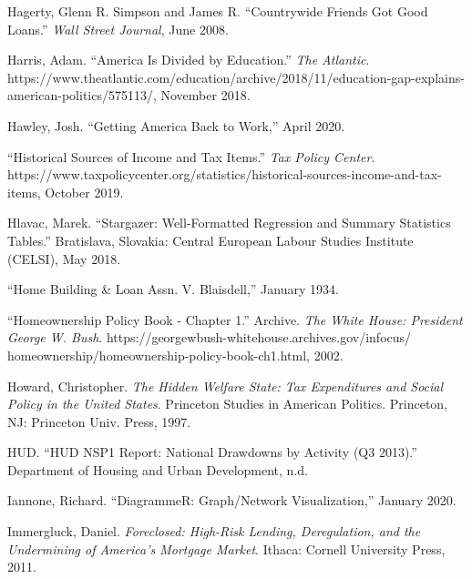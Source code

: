 \documentclass[12pt,oneside]{psthesis}
\begin{document}
\leavevmode\hypertarget{ref-hagerty2008countrywide}{}%
Hagerty, Glenn R. Simpson and James R. ``Countrywide Friends Got Good Loans.'' \emph{Wall Street Journal}, June 2008.

\leavevmode\hypertarget{ref-harris2018america}{}%
Harris, Adam. ``America Is Divided by Education.'' \emph{The Atlantic}. \\ https://www.theatlantic.com/education/archive/2018/11/education-gap-explains-\\american-politics/575113/, November 2018.

\leavevmode\hypertarget{ref-hawley2020getting}{}%
Hawley, Josh. ``Getting America Back to Work,'' April 2020.

\leavevmode\hypertarget{ref-2019historical}{}%
``Historical Sources of Income and Tax Items.'' \emph{Tax Policy Center}.\\ https://www.taxpolicycenter.org/statistics/historical-sources-income-and-tax-items, October 2019.

\leavevmode\hypertarget{ref-hlavac2018stargazer}{}%
Hlavac, Marek. ``Stargazer: Well-Formatted Regression and Summary Statistics Tables.'' Bratislava, Slovakia: Central European Labour Studies Institute (CELSI), May 2018.

\leavevmode\hypertarget{ref-1934home}{}%
``Home Building \& Loan Assn. V. Blaisdell,'' January 1934.

\leavevmode\hypertarget{ref-2002homeownership}{}%
``Homeownership Policy Book - Chapter 1.'' Archive. \emph{The White House: President George W. Bush}. https://georgewbush-whitehouse.archives.gov/infocus/\\homeownership/homeownership-policy-book-ch1.html, 2002.

\leavevmode\hypertarget{ref-howard1997hidden}{}%
Howard, Christopher. \emph{The Hidden Welfare State: Tax Expenditures and Social Policy in the United States}. Princeton Studies in American Politics. Princeton, NJ: Princeton Univ. Press, 1997.

\leavevmode\hypertarget{ref-hud2013hud}{}%
HUD. ``HUD NSP1 Report: National Drawdowns by Activity (Q3 2013).'' Department of Housing and Urban Development, n.d.

\leavevmode\hypertarget{ref-iannone2020diagrammer}{}%
Iannone, Richard. ``DiagrammeR: Graph/Network Visualization,'' January 2020.

\leavevmode\hypertarget{ref-immergluck2011foreclosed}{}%
Immergluck, Daniel. \emph{Foreclosed: High-Risk Lending, Deregulation, and the Undermining of America's Mortgage Market}. Ithaca: Cornell University Press, 2011.
\end{document}
